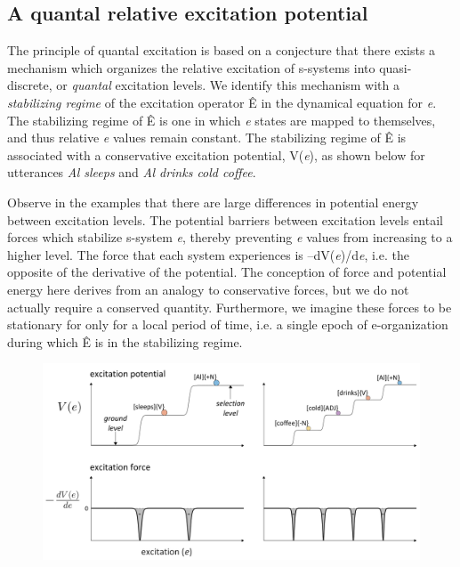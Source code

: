 \subsection{A quantal relative excitation potential}

The principle of quantal excitation is based on a conjecture that there exists a mechanism which organizes the relative excitation of s-systems into quasi-discrete, or \textit{quantal} excitation levels. We identify this mechanism with a \textit{stabilizing regime} of the excitation operator Ê in the dynamical equation for \textit{e}. The stabilizing regime of Ê is one in which \textit{e} states are mapped to themselves, and thus relative \textit{e} values remain constant. The stabilizing regime of Ê is associated with a conservative excitation potential, V(\textit{e}), as shown below for utterances \textit{Al sleeps} and \textit{Al drinks cold coffee}. 

  Observe in the examples that there are large differences in potential energy between excitation levels. The potential barriers between excitation levels entail forces which stabilize s-system \textit{e}, thereby preventing \textit{e} values from increasing to a higher level. The force that each system experiences is –dV(\textit{e})/d\textit{e}, i.e. the opposite of the derivative of the potential. The conception of force and potential energy here derives from an analogy to conservative forces, but we do not actually require a conserved quantity. Furthermore, we imagine these forces to be stationary for only for a local period of time, i.e. a single epoch of e-organization during which Ê is in the stabilizing regime. 

  
\begin{figure}
\includegraphics[width=\textwidth]{figures/Tilsen-img23.png}
\caption{\missingcaption}
\label{fig:2:16}
\end{figure}
 

